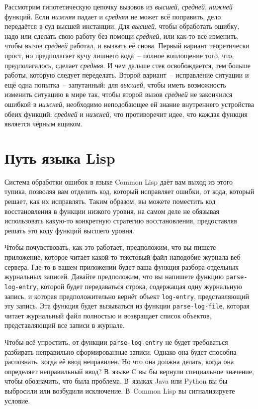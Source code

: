 Рассмотрим гипотетическую цепочку вызовов из \emph{высшей}, \emph{средней}, \emph{нижней}
функций. Если \emph{нижняя} падает и \emph{средняя} не может всё поправить, дело
передаётся в суд высшей инстанции. Для \emph{высшей}, чтобы обработать ошибку, надо или
сделать свою работу без помощи \emph{средней}, или как-то всё изменить, чтобы вызов
\emph{средней} работал, и вызвать её снова. Первый вариант теоретически прост, но
предполагает кучу лишнего кода~-- полное воплощение того, что, предполагалось, сделает
\emph{средняя}. И чем дальше стек освобождается, тем больше работы, которую следует
переделать. Второй вариант~-- исправление ситуации и ещё одна попытка~-- запутанный:
для \emph{высшей}, чтобы иметь возможность изменить ситуацию в мире так, чтобы второй
вызов \emph{средней} не закончился ошибкой в \emph{нижней}, необходимо неподобающее ей
знание внутреннего устройства обеих функций: \emph{средней} и \emph{нижней}, что
противоречит идее, что каждая функция является чёрным ящиком.

\vfill{}

\section{Путь языка Lisp}

Система обработки ошибок в языке Common Lisp даёт вам выход из этого тупика, позволяя вам
отделить код, который исправляет ошибки, от кода, который решает, как их исправлять. Таким
образом, вы можете поместить код восстановления в функции низкого уровня, на самом деле не
обязывая использовать какую-то конкретную стратегию восстановления, предоставляя решать
это коду функций высшего уровня.

Чтобы почувствовать, как это работает, предположим, что вы пишете приложение, которое
читает какой-то текстовый файл наподобие журнала веб-сервера. Где-то в вашем приложении
будет ваша функция разбора отдельных журнальных записей. Давайте предположим, что вы
напишете функцию \lstinline{parse-log-entry}, которой будет передаваться строка, содержащая
одну журнальную запись, и которая предположительно вернёт объект \lstinline{log-entry},
представляющий эту запись. Эта функция будет вызываться из функции \lstinline{parse-log-file},
которая читает журнальный файл полностью и возвращает список объектов, представляющий все
записи в журнале.

Чтобы всё упростить, от функции \lstinline{parse-log-entry} не будет требоваться разбирать
неправильно сформированные записи. Однако она будет способна распознать, когда её ввод
неправилен. Но что она должна делать, когда она определяет неправильный ввод? В~языке C вы
бы вернули специальное значение, чтобы обозначить, что была проблема. В~языках Java или
Python вы бы выбросили или возбудили исключение. В~Common Lisp вы сигнализируете условие.

